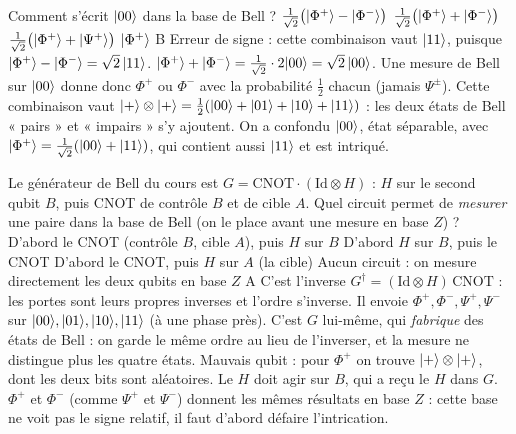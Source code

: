   {Comment s'écrit $|00\rangle$ dans la base de Bell ?}
  {$\frac{1}{\sqrt2}\big(|\Phi^+\rangle-|\Phi^-\rangle\big)$}
  {$\frac{1}{\sqrt2}\big(|\Phi^+\rangle+|\Phi^-\rangle\big)$}
  {$\frac{1}{\sqrt2}\big(|\Phi^+\rangle+|\Psi^+\rangle\big)$}
  {$|\Phi^+\rangle$}
  {B}
\qcmx
  {Erreur de signe : cette combinaison vaut $|11\rangle$, puisque $|\Phi^+\rangle-|\Phi^-\rangle=\sqrt2\,|11\rangle$.}
  {$|\Phi^+\rangle+|\Phi^-\rangle=\frac{1}{\sqrt2}\cdot2|00\rangle=\sqrt2\,|00\rangle$. Une mesure de Bell sur $|00\rangle$ donne donc $\Phi^+$ ou $\Phi^-$ avec la probabilité $\frac12$ chacun (jamais $\Psi^\pm$).}
  {Cette combinaison vaut $|+\rangle\otimes|+\rangle=\frac12(|00\rangle+|01\rangle+|10\rangle+|11\rangle)$ : les deux états de Bell « pairs » et « impairs » s'y ajoutent.}
  {On a confondu $|00\rangle$, état séparable, avec $|\Phi^+\rangle=\frac{1}{\sqrt2}(|00\rangle+|11\rangle)$, qui contient aussi $|11\rangle$ et est intriqué.}

  {Le générateur de Bell du cours est $G=\mathrm{CNOT}\cdot(\mathrm{Id}\otimes H)$ : $H$ sur le second qubit $B$, puis CNOT de contrôle $B$ et de cible $A$. Quel circuit permet de \emph{mesurer} une paire dans la base de Bell (on le place avant une mesure en base $Z$) ?}
  {D'abord le CNOT (contrôle $B$, cible $A$), puis $H$ sur $B$}
  {D'abord $H$ sur $B$, puis le CNOT}
  {D'abord le CNOT, puis $H$ sur $A$ (la cible)}
  {Aucun circuit : on mesure directement les deux qubits en base $Z$}
  {A}
\qcmx
  {C'est l'inverse $G^\dagger=(\mathrm{Id}\otimes H)\,\mathrm{CNOT}$ : les portes sont leurs propres inverses et l'ordre s'inverse. Il envoie $\Phi^+,\Phi^-,\Psi^+,\Psi^-$ sur $|00\rangle,|01\rangle,|10\rangle,|11\rangle$ (à une phase près).}
  {C'est $G$ lui-même, qui \emph{fabrique} des états de Bell : on garde le même ordre au lieu de l'inverser, et la mesure ne distingue plus les quatre états.}
  {Mauvais qubit : pour $\Phi^+$ on trouve $|+\rangle\otimes|+\rangle$, dont les deux bits sont aléatoires. Le $H$ doit agir sur $B$, qui a reçu le $H$ dans $G$.}
  {$\Phi^+$ et $\Phi^-$ (comme $\Psi^+$ et $\Psi^-$) donnent les mêmes résultats en base $Z$ : cette base ne voit pas le signe relatif, il faut d'abord défaire l'intrication.}

